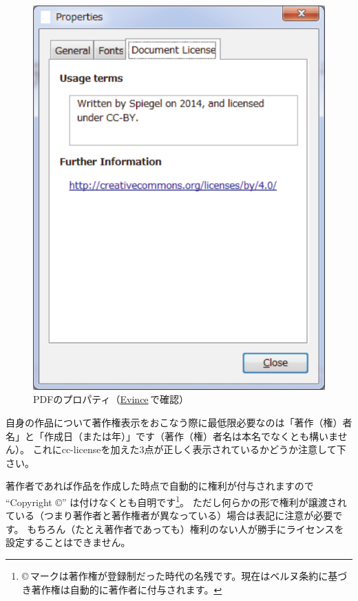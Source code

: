 \documentclass{ltjsarticle}
\begin{document}
\begin{figure}[htp]
\begin{center}
\includegraphics[width=5truecm,clip]{images/pdf-property.pdf}
\end{center}
\caption{PDFのプロパティ（\href{https://wiki.gnome.org/Apps/Evince}{Evince}\,で確認）} \label{fig:pdf-prop}
\end{figure}%

自身の作品について著作権表示をおこなう際に最低限必要なのは「著作（権）者名」と「作成日（または年）」です（著作（権）者名は本名でなくとも構いません）。
これにcc-licenseを加えた3点が正しく表示されているかどうか注意して下さい。

著作者であれば作品を作成した時点で自動的に権利が付与されますので ``Copyright \copyright'' は付けなくとも自明です\footnote{\copyright\,マークは著作権が登録制だった時代の名残です。現在はベルヌ条約に基づき著作権は自動的に著作者に付与されます。}。
ただし何らかの形で権利が譲渡されている（つまり著作者と著作権者が異なっている）場合は表記に注意が必要です。
もちろん（たとえ著作者であっても）権利のない人が勝手にライセンスを設定することはできません。
\end{document}
